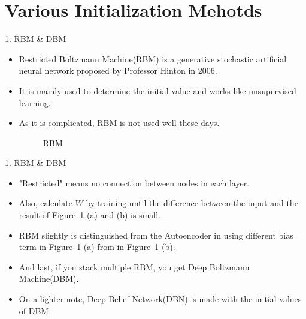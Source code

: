 \documentclass{beamer}
\begin{document}
	\section{Various Initialization Mehotds}
	\begin{frame}{1. RBM \& DBM}
		\begin{itemize}
			\item Restricted Boltzmann Machine(RBM)\cite{rbm} is a generative stochastic artificial neural network proposed by Professor Hinton in 2006.
			\item It is mainly used to determine the initial value and works like unsupervised learning.
			\item As it is complicated, RBM is not used well these days.
			\vspace{10pt}
			\begin{figure}[h]
				\centering
				\quad
				\caption{RBM}
				\label{fig:rbm}
			\end{figure}
		\end{itemize}
	\end{frame}


	\begin{frame}{1. RBM \& DBM}
		\begin{itemize}
			\item "Restricted" means no connection between nodes in each layer.
			\item Also, calculate $W$ by training until the difference between the input and the result of Figure~\ref{fig:rbm} (a) and (b) is small.
			\item RBM slightly is distinguished from the Autoencoder in using different bias term in Figure~\ref{fig:rbm} (a) from in Figure~\ref{fig:rbm} (b).
			\item And last, if you stack multiple RBM, you get Deep Boltzmann Machine(DBM).
			\item On a lighter note, Deep Belief Network(DBN) is made with the initial values of DBM.
		\end{itemize}
	\end{frame}	
\end{document}
